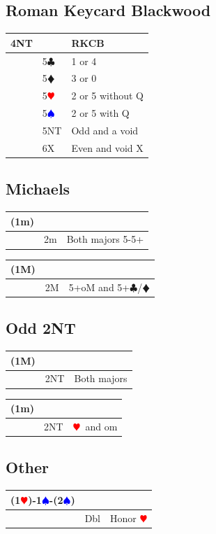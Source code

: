 \documentclass[a4paper]{article}
\newcommand{\BC}{\textcolor{OliveGreen}{$\clubsuit$}}
\newcommand{\BD}{\textcolor{RedOrange}{$\vardiamondsuit$}}
\newcommand{\BH}{\textcolor{Red}{$\varheartsuit${}}}
\newcommand{\BS}{\textcolor{Blue}{$\spadesuit${}}}
\begin{document}
\subsection{Roman Keycard Blackwood}

\begingroup
\renewcommand{\arraystretch}{1.4}
\begin{xltabular}{\linewidth}{|l|l|X|}
\hline
4NT &  & RKCB \\
\hline
 & 5\BC & 1 or 4 \\
\hline
 & 5\BD & 3 or 0 \\
\hline
 & 5\BH & 2 or 5 without Q \\
\hline
 & 5\BS & 2 or 5 with Q \\
\hline
 & 5NT & Odd and a void \\
\hline
 & 6X & Even and void X \\
\hline
\end{xltabular}
\endgroup
\bigbreak
\subsection{Michaels}

\begingroup
\renewcommand{\arraystretch}{1.4}
\begin{xltabular}{\linewidth}{|l|l|X|}
\hline
(1m) &  &  \\
\hline
 & 2m & Both majors 5-5+ \\
\hline
\end{xltabular}
\endgroup
\bigbreak
\begingroup
\renewcommand{\arraystretch}{1.4}
\begin{xltabular}{\linewidth}{|l|l|X|}
\hline
(1M) &  &  \\
\hline
 & 2M & 5+oM and 5+\BC /\BD \\
\hline
\end{xltabular}
\endgroup
\bigbreak
\subsection{Odd 2NT}

\begingroup
\renewcommand{\arraystretch}{1.4}
\begin{xltabular}{\linewidth}{|l|l|X|}
\hline
(1M) &  &  \\
\hline
 & 2NT & Both majors \\
\hline
\end{xltabular}
\endgroup
\bigbreak
\begingroup
\renewcommand{\arraystretch}{1.4}
\begin{xltabular}{\linewidth}{|l|l|X|}
\hline
(1m) &  &  \\
\hline
 & 2NT & \BH\ and om \\
\hline
\end{xltabular}
\endgroup
\bigbreak
\subsection{Other}

\begingroup
\renewcommand{\arraystretch}{1.4}
\begin{xltabular}{\linewidth}{|l|l|X|}
\hline
(1\BH)-1\BS-(2\BS) &  &  \\
\hline
 & Dbl & Honor \BH \\
\hline
\end{xltabular}
\endgroup
\bigbreak
\end{document}

